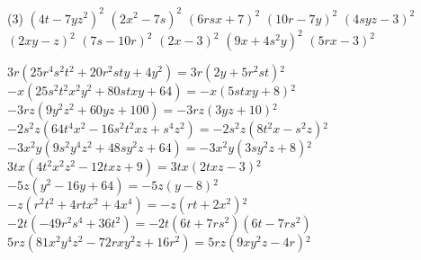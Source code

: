 \documentclass[a4paper,12pt]{report}
\begin{document}
\begin{core}\phantom{ }

\begin{tasks}(3)
\task ${{\left(4 t-7 y z^2\right)^2}}$
\task ${{\left(2 x^2-7 s\right)^2}}$
\task ${{\left(6 r s x+7 \right)^2}}$
\task ${{\left(10 r-7 y\right)^2}}$
\task ${{\left(4 s y z-3 \right)^2}}$
\task ${{\left(2 x y-z\right)^2}}$
\task ${{\left(7 s-10 r\right)^2}}$
\task ${{\left(2 x-3 \right)^2}}$
\task ${{\left(9 x+4 s^2 y\right)^2}}$
\task ${{\left(5 r x-3 \right)^2}}$
\end{tasks}

\end{core}

\begin{core}\phantom{ }

\begin{tasks}
\task ${{3 r}}\mathopen{}\left(25 r^4 s^2 t^2 + 20 r^2 s t y + 4 y^2\right)\mathclose{}={{3 r\mathopen{}\left(2 y+5 r^2 s t\right)\mathclose{}^2}}$
\task ${{-x}}\mathopen{}\left(25 s^2 t^2 x^2 y^2 + 80 s t x y + 64 \right)\mathclose{}={{-x\mathopen{}\left(5 s t x y+8 \right)\mathclose{}^2}}$
\task ${{-3 r z}}\mathopen{}\left(9 y^2 z^2 + 60 y z + 100 \right)\mathclose{}={{-3 r z\mathopen{}\left(3 y z+10 \right)\mathclose{}^2}}$
\task ${{-2 s^2 z}}\mathopen{}\left(64 t^4 x^2-16 s^2 t^2 x z + s^4 z^2\right)\mathclose{}={{-2 s^2 z\mathopen{}\left(8 t^2 x-s^2 z\right)\mathclose{}^2}}$
\task ${{-3 x^2 y}}\mathopen{}\left(9 s^2 y^4 z^2 + 48 s y^2 z + 64 \right)\mathclose{}={{-3 x^2 y\mathopen{}\left(3 s y^2 z+8 \right)\mathclose{}^2}}$
\task ${{3 t x}}\mathopen{}\left(4 t^2 x^2 z^2-12 t x z + 9 \right)\mathclose{}={{3 t x\mathopen{}\left(2 t x z-3 \right)\mathclose{}^2}}$
\task ${{-5 z}}\mathopen{}\left(y^2-16 y + 64 \right)\mathclose{}={{-5 z\mathopen{}\left(y-8 \right)\mathclose{}^2}}$
\task ${{-z}}\mathopen{}\left(r^2 t^2 + 4 r t x^2 + 4 x^4\right)\mathclose{}={{-z\mathopen{}\left(r t+2 x^2\right)\mathclose{}^2}}$
\task ${{-2 t}}\mathopen{}\left(-49 r^2 s^4 + 36 t^2\right)\mathclose{}={{-2 t\mathopen{}\left(6 t+ 7 r s^2\right)\mathclose{}\mathopen{}\left(6 t-7 r s^2\right)\mathclose{}}}$
\task ${{5 r z}}\mathopen{}\left(81 x^2 y^4 z^2-72 r x y^2 z + 16 r^2\right)\mathclose{}={{5 r z\mathopen{}\left(9 x y^2 z-4 r\right)\mathclose{}^2}}$
\end{tasks}

\end{core}
\end{document}
